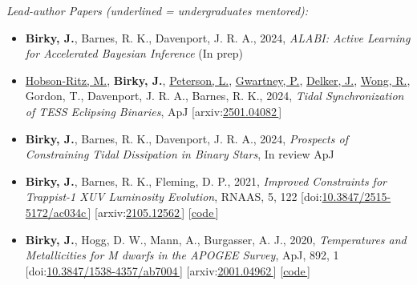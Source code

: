 \documentclass[a4,11pt]{article}
\let\orighref\href
\renewcommand{\href}[2]{\orighref{#1}{#2\,\scriptsize\faExternalLink}}
\begin{document}
\textsl{Lead-author Papers (underlined = undergraduates mentored):} 
\begin{itemize}[itemsep=0pt]
    \item \textbf{Birky, J.}, Barnes, R. K., Davenport, J. R. A., 2024, \textsl{ALABI: Active Learning for Accelerated Bayesian Inference} (In prep)
    \item \underline{Hobson-Ritz, M.}, \textbf{Birky, J.}, \underline{Peterson, L.}, \underline{Gwartney, P.}, \underline{Delker, J.}, \underline{Wong, R.}, Gordon, T., Davenport, J. R. A., Barnes, R. K., 2024, \textsl{Tidal Synchronization of TESS Eclipsing Binaries}, ApJ [arxiv:\href{https://arxiv.org/abs/2501.04082}{2501.04082}]
    \item \textbf{Birky, J.}, Barnes, R. K., Davenport, J. R. A., 2024, \textsl{Prospects of Constraining Tidal Dissipation in Binary Stars}, In review ApJ
    \item \textbf{Birky, J.}, Barnes, R. K., Fleming, D. P., 2021, \textsl{Improved Constraints for Trappist-1 XUV Luminosity Evolution}, RNAAS, 5, 122  [doi:\href{https://iopscience.iop.org/article/10.3847/2515-5172/ac034c}{10.3847/2515-5172/ac034c}] [arxiv:\href{https://arxiv.org/abs/2105.12562}{2105.12562}] [\href{https://github.com/jbirky/trappist_xuv}{code}]
    \item \textbf{Birky, J.}, Hogg, D. W., Mann, A., Burgasser, A. J., 2020, \textsl{Temperatures and Metallicities for M dwarfs in the APOGEE Survey}, ApJ, 892, 1 [doi:\href{https://iopscience.iop.org/article/10.3847/1538-4357/ab7004}{10.3847/1538-4357/ab7004}] [arxiv:\href{https://arxiv.org/abs/2001.04962}{2001.04962}] [\href{https://github.com/jbirky/Mdwarf_project}{code}]
\end{itemize}
\end{document}
